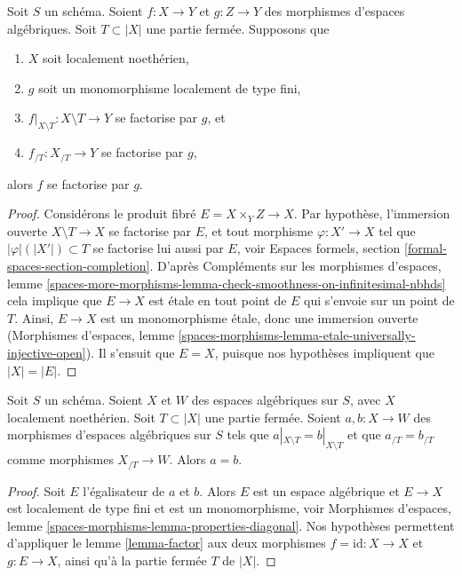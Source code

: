 \begin{lemma}
\label{lemma-factor}
Soit $S$ un schéma. Soient $f : X \to Y$ et $g : Z \to Y$ des morphismes
d'espaces algébriques. Soit $T \subset |X|$ une partie fermée.
Supposons que
\begin{enumerate}
\item $X$ soit localement noethérien,
\item $g$ soit un monomorphisme localement de type fini,
\item $f|_{X \setminus T} : X \setminus T \to Y$ se factorise par $g$, et
\item $f_{/T} : X_{/T} \to Y$ se factorise par $g$,
\end{enumerate}
alors $f$ se factorise par $g$.
\end{lemma}

\begin{proof}
Considérons le produit fibré $E = X \times_Y Z \to X$.
Par hypothèse, l'immersion ouverte $X \setminus T \to X$
se factorise par $E$, et tout morphisme $\varphi : X' \to X$ tel que
$|\varphi|(|X'|) \subset T$ se factorise lui aussi par $E$, voir
Espaces formels, section \ref{formal-spaces-section-completion}.
D'après Compléments sur les morphismes d'espaces, lemme
\ref{spaces-more-morphisms-lemma-check-smoothness-on-infinitesimal-nbhds}
cela implique que $E \to X$ est étale en tout point de $E$
qui s'envoie sur un point de $T$. Ainsi, $E \to X$ est un
monomorphisme étale, donc une immersion ouverte
(Morphismes d'espaces, lemme
\ref{spaces-morphisms-lemma-etale-universally-injective-open}).
Il s'ensuit que $E = X$, puisque nos hypothèses impliquent que $|X| = |E|$.
\end{proof}

\begin{lemma}
\label{lemma-faithful-general}
Soit $S$ un schéma. Soient $X$ et $W$ des espaces algébriques sur $S$, avec
$X$ localement noethérien. Soit $T \subset |X|$ une partie fermée.
Soient $a, b : X \to W$ des morphismes d'espaces algébriques sur $S$ tels
que $a|_{X \setminus T} = b|_{X \setminus T}$ et que
$a_{/T} = b_{/T}$ comme morphismes $X_{/T} \to W$. Alors $a = b$.
\end{lemma}

\begin{proof}
Soit $E$ l'égalisateur de $a$ et $b$. Alors $E$ est un espace algébrique
et $E \to X$ est localement de type fini et est un monomorphisme, voir
Morphismes d'espaces, lemme \ref{spaces-morphisms-lemma-properties-diagonal}.
Nos hypothèses permettent d'appliquer le lemme \ref{lemma-factor} aux deux
morphismes $f = \text{id} : X \to X$ et $g : E \to X$, ainsi qu'à la partie
fermée $T$ de $|X|$.
\end{proof}

